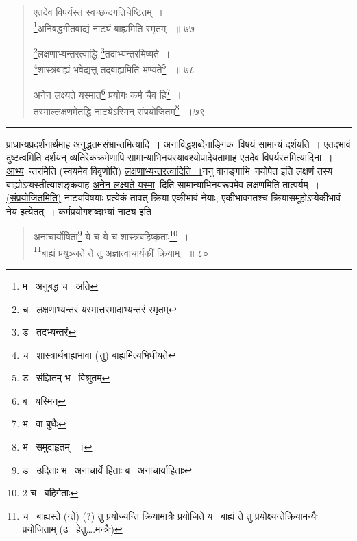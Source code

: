 \documentclass[11pt, openany]{book}
\begin{document}
{\begin{quote}
{एतदेव विपर्यस्तं स्वच्छन्दगतिचेष्टितम्~। \\
\renewcommand{\thefootnote}{6}\footnote{म \textendash\ अनुबद्ध च \textendash\ अति}अनिबद्धगीतवाद्यं नाट्यं बाह्यमिति स्मृतम् ~॥ ७७ 

\renewcommand{\thefootnote}{7}\footnote{च \textendash\ लक्षणाभ्यन्तरं यस्मात्तस्मादाभ्यन्तरं स्मृतम्}लक्षणाभ्यन्तरत्वाद्धि \renewcommand{\thefootnote}{8}\footnote{ड \textendash\ तदभ्यन्तरं }तदाभ्यन्तरमिष्यते~। \\
\renewcommand{\thefootnote}{9}\footnote{च \textendash\ शास्त्रार्थबाह्यभावा (त्तु) बाह्यमित्यभिधीयते}शास्त्रबाह्यं भवेद्यत्तु तद्बाह्यमिति भण्यते\renewcommand{\thefootnote}{10}\footnote{ड \textendash\ संज्ञितम् भ \textendash\ विश्रुतम्} ~॥ ७८ 

अनेन लक्ष्यते यस्मात्\renewcommand{\thefootnote}{11}\footnote{ब \textendash\ यस्मिन्} प्रयोगः कर्म चैव हि\renewcommand{\thefootnote}{12}\footnote{भ \textendash\ वा बुधैः}~। \\
तस्माल्लक्षणमेतद्धि नाट्येऽस्मिन् संप्रयोजितम्\renewcommand{\thefootnote}{13}\footnote{भ \textendash\ समुदाहृतम् ~।} ~॥७९ }
\end{quote}

\hrule

\vspace{2mm}

\noindent
प्राधान्यप्रदर्शनार्थमाह \underline{अनुद्धतमसंभ्रान्तमित्यादि~।} अनाविद्धशब्देनाङ्गिक\textendash\ विषयं सामान्यं दर्शयति~। एतदभावं दुष्टत्वमिति दर्शयन् व्यतिरेकक्रमेणापि सामान्याभिनयस्यावश्योपादेयतामाह एतदेव विपर्यस्तमित्यादिना~। \underline{आभ्य}\textendash\ न्तरमिति (स्वयमेव विवृणोति) \underline{लक्षणाभ्यन्तरत्वादिति~।}ननु वागङ्गाभि\textendash\ नयोपेत इति लक्षणं तस्य बाह्योऽप्यस्तीत्याशङ्कयाह \underline{अनेन लक्ष्यते यस्मा}\textendash\ दिति सामान्याभिनयरूपमेव लक्षणमिति तात्पर्यम्~। \underline{(संप्रयोजितमिति)} नाट्यविषयाः प्रत्येकं तावत् क्रिया एकीभावं नेयाः, एकीभावगतश्च क्रियासमूहोऽप्येकीभावं नेय इत्येतत्~। \underline{कर्मप्रयोगशब्दाभ्यां नाट्य इति }

\newpage

\begin{quote}
 {\na अनाचार्योषिता\renewcommand{\thefootnote}{1}\footnote{ड \textendash\ उदिताः भ \textendash\ अनाचार्ये हिताः ब \textendash\ अनाचार्याहिताः } ये च ये च शास्त्रबहिष्कृताः\renewcommand{\thefootnote}{2}\footnote{2 च \textendash\ बहिर्गताः}~। \\
\renewcommand{\thefootnote}{3}\footnote{च \textendash\ बाह्यस्ते (न्ते) (?) तु प्रयोज्यन्ति क्रियामात्रैः प्रयोजिते य \textendash\ बाह्यं ते तु प्रयोक्ष्यन्तेक्रियामन्यैः प्रयोजिताम् (ढ \textendash\ हेतु\ldots .मन्त्रैः) }बाह्यं प्रयुञ्जते ते तु अज्ञात्वाचार्यकीं क्रियाम् ~॥ ८० 

}
\end{quote}}
\end{document}

